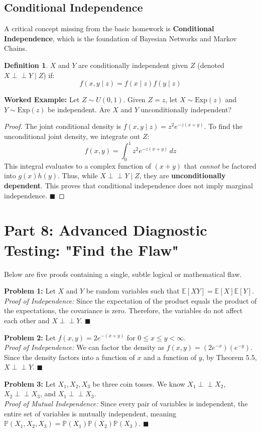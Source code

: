 \documentclass[11pt, a4paper]{article}
\theoremstyle{definition}
\newtheorem{definition}{Definition}[section]
\theoremstyle{remark}
\newcommand{\E}{\mathbb{E}}
\newcommand{\Prob}{\mathbb{P}}
\newcommand{\indep}{\perp\!\!\!\perp}
\begin{document}
\subsection{Conditional Independence}
A critical concept missing from the basic homework is \textbf{Conditional Independence}, which is the foundation of Bayesian Networks and Markov Chains.
\begin{definition}
$X$ and $Y$ are conditionally independent given $Z$ (denoted $X \indep Y \mid Z$) if:
\[ f(x, y \mid z) = f(x \mid z)f(y \mid z) \]
\end{definition}

\textbf{Worked Example:} Let $Z \sim U(0,1)$. Given $Z=z$, let $X \sim \text{Exp}(z)$ and $Y \sim \text{Exp}(z)$ be independent. Are $X$ and $Y$ unconditionally independent?
\begin{proof}
The joint conditional density is $f(x, y \mid z) = z^2 e^{-z(x+y)}$.
To find the unconditional joint density, we integrate out $Z$:
\[ f(x, y) = \int_{0}^{1} z^2 e^{-z(x+y)} \, dz \]
This integral evaluates to a complex function of $(x+y)$ that \textit{cannot} be factored into $g(x)h(y)$. Thus, while $X \indep Y \mid Z$, they are \textbf{unconditionally dependent}. This proves that conditional independence does not imply marginal independence. $\blacksquare$
\end{proof}

\section{Part 8: Advanced Diagnostic Testing: "Find the Flaw"}

Below are five proofs containing a single, subtle logical or mathematical flaw. 

\textbf{Problem 1:} Let $X$ and $Y$ be random variables such that $\E[XY] = \E[X]\E[Y]$. \\
\textit{Proof of Independence:} Since the expectation of the product equals the product of the expectations, the covariance is zero. Therefore, the variables do not affect each other and $X \indep Y$. $\blacksquare$

\textbf{Problem 2:} Let $f(x,y) = 2e^{-(x+y)}$ for $0 \le x \le y < \infty$. \\
\textit{Proof of Independence:} We can factor the density as $f(x,y) = (2e^{-x})(e^{-y})$. Since the density factors into a function of $x$ and a function of $y$, by Theorem 5.5, $X \indep Y$. $\blacksquare$

\textbf{Problem 3:} Let $X_1, X_2, X_3$ be three coin tosses. We know $X_1 \indep X_2$, $X_2 \indep X_3$, and $X_1 \indep X_3$. \\
\textit{Proof of Mutual Independence:} Since every pair of variables is independent, the entire set of variables is mutually independent, meaning $\Prob(X_1, X_2, X_3) = \Prob(X_1)\Prob(X_2)\Prob(X_3)$. $\blacksquare$
\end{document}
